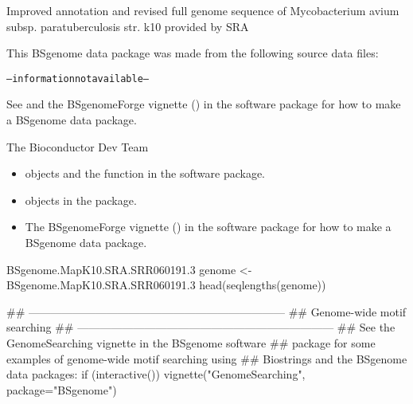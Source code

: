 \documentclass[a4paper]{book}
\begin{document}
%
\begin{Description}\relax
Improved annotation and revised full genome sequence of Mycobacterium avium subsp. paratuberculosis str. k10 provided by SRA
\end{Description}
%
\begin{Note}\relax
This BSgenome data package was made from the following source data files:
\begin{alltt}
-- information not available --
  \end{alltt}


See  and the BSgenomeForge
vignette () in the 
software package for how to make a BSgenome data package.
\end{Note}
%
\begin{Author}\relax
The Bioconductor Dev Team
\end{Author}
%
\begin{SeeAlso}\relax
\begin{itemize}

\item {} objects and the
 function
in the  software package.
\item {} objects in the 
package.
\item The BSgenomeForge vignette ()
in the  software package for how to make a BSgenome
data package.

\end{itemize}

\end{SeeAlso}
%
\begin{Examples}
\begin{ExampleCode}
BSgenome.MapK10.SRA.SRR060191.3
genome <- BSgenome.MapK10.SRA.SRR060191.3
head(seqlengths(genome))


## ---------------------------------------------------------------------
## Genome-wide motif searching
## ---------------------------------------------------------------------
## See the GenomeSearching vignette in the BSgenome software
## package for some examples of genome-wide motif searching using
## Biostrings and the BSgenome data packages:
if (interactive())
    vignette("GenomeSearching", package="BSgenome")
\end{ExampleCode}
\end{Examples}
\printindex{}
\end{document}
